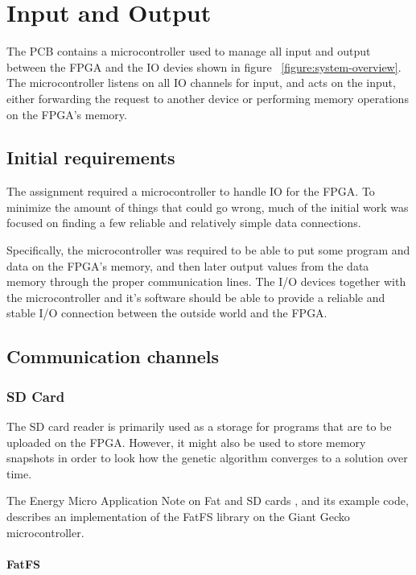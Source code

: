\section{Input and Output}
The PCB contains a microcontroller used to manage all input and output between the FPGA and the IO devies shown in figure ~\ref{figure:system-overview}.
The microcontroller listens on all IO channels for input, and acts on the input, either forwarding the request to another device or performing memory operations on the FPGA's memory.

\subsection{Initial requirements}
The assignment required a microcontroller to handle IO for the FPGA.
To minimize the amount of things that could go wrong, much of the initial work was focused on finding a few reliable and relatively simple data connections.

Specifically, the microcontroller was required to be able to put some program and data on the FPGA's memory, and then later output values from the data memory through the proper communication lines.
The I/O devices together with the microcontroller and it's software should be able to provide a reliable and stable I/O connection between the outside world and the FPGA.

\subsection{Communication channels}
\subsubsection{SD Card}
The SD card reader is primarily used as a storage for programs that are to be uploaded on the FPGA.
However, it might also be used to store memory snapshots in order to look how the genetic algorithm converges to a solution over time.

The Energy Micro Application Note on Fat and SD cards , and its example code, describes an implementation of the FatFS library on the Giant Gecko microcontroller.

\paragraph{FatFS}\cite{fatfs-web}

